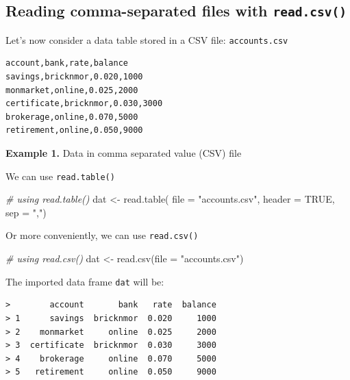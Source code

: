 \documentclass[
]{book}
\newenvironment{Shaded}{\begin{snugshade}}{\end{snugshade}}
\newcommand{\AttributeTok}[1]{\textcolor[rgb]{0.77,0.63,0.00}{#1}}
\newcommand{\CommentTok}[1]{\textcolor[rgb]{0.56,0.35,0.01}{\textit{#1}}}
\newcommand{\ConstantTok}[1]{\textcolor[rgb]{0.00,0.00,0.00}{#1}}
\newcommand{\FunctionTok}[1]{\textcolor[rgb]{0.00,0.00,0.00}{#1}}
\newcommand{\NormalTok}[1]{#1}
\newcommand{\OtherTok}[1]{\textcolor[rgb]{0.56,0.35,0.01}{#1}}
\newcommand{\StringTok}[1]{\textcolor[rgb]{0.31,0.60,0.02}{#1}}
\begin{document}
\hypertarget{reading-comma-separated-files-with-read.csv}{%
\subsection{\texorpdfstring{Reading comma-separated files with \texttt{read.csv()}}{Reading comma-separated files with read.csv()}}\label{reading-comma-separated-files-with-read.csv}}

Let's now consider a data table stored in a CSV file: \texttt{accounts.csv}

\begin{verbatim}
account,bank,rate,balance
savings,bricknmor,0.020,1000
monmarket,online,0.025,2000
certificate,bricknmor,0.030,3000
brokerage,online,0.070,5000
retirement,online,0.050,9000
\end{verbatim}

\textbf{Example 1.} Data in comma separated value (CSV) file

We can use \texttt{read.table()}

\begin{Shaded}
\begin{Highlighting}[]
\CommentTok{\# using read.table()}
\NormalTok{dat }\OtherTok{\textless{}{-}} \FunctionTok{read.table}\NormalTok{(}
  \AttributeTok{file =} \StringTok{"accounts.csv"}\NormalTok{,}
  \AttributeTok{header =} \ConstantTok{TRUE}\NormalTok{,}
  \AttributeTok{sep =} \StringTok{","}\NormalTok{)}
\end{Highlighting}
\end{Shaded}

Or more conveniently, we can use \texttt{read.csv()}

\begin{Shaded}
\begin{Highlighting}[]
\CommentTok{\# using read.csv()}
\NormalTok{dat }\OtherTok{\textless{}{-}} \FunctionTok{read.csv}\NormalTok{(}\AttributeTok{file =} \StringTok{"accounts.csv"}\NormalTok{)}
\end{Highlighting}
\end{Shaded}

The imported data frame \texttt{dat} will be:

\begin{verbatim}
>        account       bank   rate  balance
> 1      savings  bricknmor  0.020     1000
> 2    monmarket     online  0.025     2000
> 3  certificate  bricknmor  0.030     3000
> 4    brokerage     online  0.070     5000
> 5   retirement     online  0.050     9000
\end{verbatim}
\end{document}
